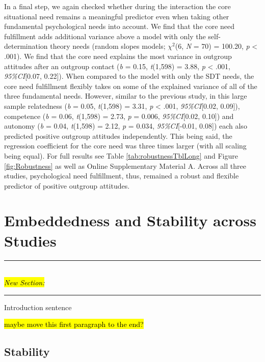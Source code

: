 In a final step, we again checked whether during the interaction the
core situational need remains a meaningful predictor even when taking
other fundamental psychological needs into account. We find that the
core need fulfillment adds additional variance above a model with only
the self-determination theory needs (random slopes models; \(\chi^2\)(6,
\textit{N} = 70) = 100.20, \textit{p} \textless{} .001). We find that
the core need explains the most variance in outgroup attitudes after an
outgroup contact (\textit{b} = 0.15, \textit{t}(1,598) = 3.88,
\textit{p} \textless{} .001, \textit{95\%CI}{[}0.07, 0.22{]}). When
compared to the model with only the SDT needs, the core need fulfillment
flexibly takes on some of the explained variance of all of the three
fundamental needs. However, similar to the previous study, in this large
sample relatedness (\textit{b} = 0.05, \textit{t}(1,598) = 3.31,
\textit{p} \textless{} .001, \textit{95\%CI}{[}0.02, 0.09{]}),
competence (\textit{b} = 0.06, \textit{t}(1,598) = 2.73, \textit{p} =
0.006, \textit{95\%CI}{[}0.02, 0.10{]}) and autonomy (\textit{b} = 0.04,
\textit{t}(1,598) = 2.12, \textit{p} = 0.034, \textit{95\%CI}{[}-0.01,
0.08{]}) each also predicted positive outgroup attitudes independently.
This being said, the regression coefficient for the core need was three
times larger (with all scaling being equal). For full results see Table
\ref{tab:robustnessTblLong} and Figure \ref{fig:Robustness} as well as
Online Supplementary Material A. Across all three studies, psychological
need fulfillment, thus, remained a robust and flexible predictor of
positive outgroup attitudes.

\section{Embeddedness and Stability across Studies}

\begin{center}
    \noindent\rule{8cm}{0.4pt}\\
    \hl{\textit{New Section:}}\\
    \vspace{-0.25cm}
    \noindent\rule{8cm}{0.4pt}
\end{center}

Introduction sentence

\hl{maybe move this first paragraph to the end?}
\subsection{Stability}


